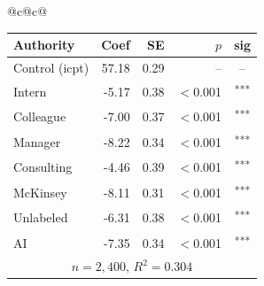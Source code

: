 \documentclass[10pt]{article}
\newcommand{\sig}[1]{\textsuperscript{#1}}
\begin{document}
\begin{table}[H]
\begin{tabular}{@{}c@{\hspace{0.5em}}c@{}}
\begin{minipage}[t]{0.49\textwidth}
\begin{tabular}{@{}l r r r c@{}}
\toprule
Authority & Coef & SE & $p$ & sig \\
\midrule
\cellcolor{gray!22}Control (icpt) & \cellcolor{gray!22}57.18 & \cellcolor{gray!22}0.29 & \cellcolor{gray!22}-- & \cellcolor{gray!22}-- \\
\midrule
Intern & -5.17 & 0.38 & $<$0.001 & \sig{***} \\
Colleague & -7.00 & 0.37 & $<$0.001 & \sig{***} \\
Manager & -8.22 & 0.34 & $<$0.001 & \sig{***} \\
\midrule
Consulting & -4.46 & 0.39 & $<$0.001 & \sig{***} \\
McKinsey & -8.11 & 0.31 & $<$0.001 & \sig{***} \\
\midrule
Unlabeled & -6.31 & 0.38 & $<$0.001 & \sig{***} \\
AI & -7.35 & 0.34 & $<$0.001 & \sig{***} \\
\midrule
\multicolumn{5}{c}{\scriptsize $n=2{,}400$, $R^2=0.304$} \\
\bottomrule\end{tabular}
\end{minipage} \\
\end{tabular}
\end{table}
\end{document}
